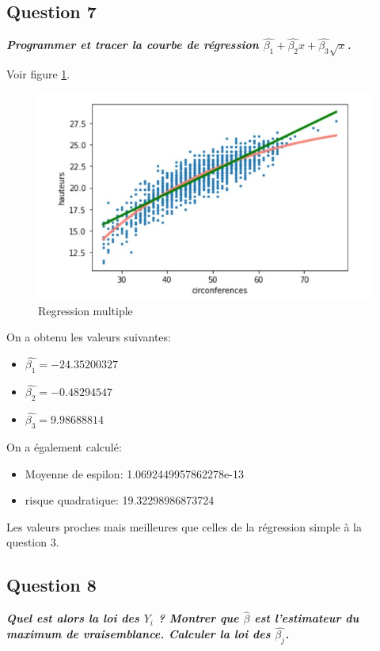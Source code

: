 \documentclass[pdflatex]{article}
\theoremstyle{definition}
\newcommand{\quest}[1]{\textbf{\textit{#1}} \vspace{3mm}}
\begin{document}
\subsection*{Question 7}
\quest{Programmer et tracer la courbe de r\'egression $\hat{\beta_1} + \hat{\beta_2}x + \hat{\beta_3}\sqrt{x}$.}

Voir figure \ref{fig:Regression multiple}.

\begin{figure}
	\includegraphics[scale=1]{regression_multiple.jpg}
    \caption{Regression multiple}
    \label{fig:Regression multiple}
\end{figure}

\vspace{5mm}
On a obtenu les valeurs suivantes:
\begin{itemize}
    \item $\hat{\beta_1} = -24.35200327$
    \item $\hat{\beta_2} = -0.48294547$
    \item $\hat{\beta_3} = 9.98688814$
\end{itemize}

\vspace{5mm}
On a \'egalement calcul\'e:
\begin{itemize}
    \item Moyenne de espilon: 1.0692449957862278e-13
    \item risque quadratique: 19.32298986873724
\end{itemize}

\vspace{5mm}
Les valeurs proches mais meilleures que celles de la r\'egression simple \`a la question 3.


\subsection*{Question 8}
\quest{Quel est alors la loi des $Y_i$ ? Montrer que $\hat{\beta}$ est l'estimateur du maximum de vraisemblance. Calculer la loi des $\hat{\beta_j}$.}
\end{document}

